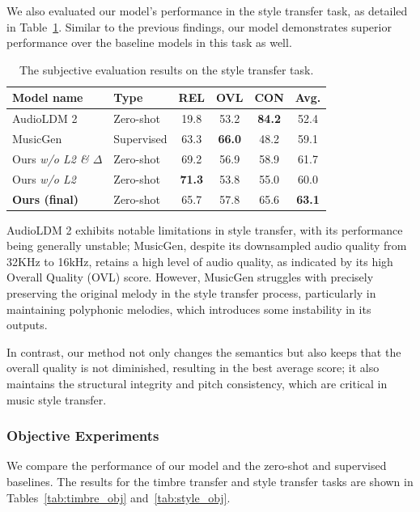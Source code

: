 We also evaluated our model's performance in the style transfer task, as detailed in Table~\ref{tab:style_sub}. Similar to the previous findings, our model demonstrates superior performance over the baseline models in this task as well.

\begin{table}[tb]
\small
    \centering
    \begin{tabular}{l|l|ccc|c}
    \toprule
    \textbf{Model name} & \textbf{Type}    &  \textbf{REL}  & \textbf{OVL} & \textbf{CON} & \textbf{Avg.} \\ 
    \midrule
    AudioLDM 2 &   Zero-shot & 19.8 & 53.2 & \textbf{84.2} & 52.4\\
    MusicGen & Supervised & 63.3 & \textbf{66.0} & 48.2 & 59.1\\
    \midrule
    Ours \textit{w/o L2 \& $\Delta$} & Zero-shot &69.2&56.9&58.9 & 61.7\\
    Ours \textit{w/o L2} & Zero-shot &\textbf{71.3}&53.8&55.0 & 60.0\\
    \midrule
    \textbf{Ours (final)} & Zero-shot & 65.7&57.8&65.6 & \textbf{63.1}\\
    \bottomrule
    \end{tabular}
    \caption{The subjective evaluation results on the style transfer task.}
    \label{tab:style_sub}
\end{table}

AudioLDM 2 exhibits notable limitations in style transfer, with its performance being generally unstable; MusicGen, despite its downsampled audio quality from 32KHz to 16kHz, retains a high level of audio quality, as indicated by its high Overall Quality (OVL) score. However, MusicGen struggles with precisely preserving the original melody in the style transfer process, particularly in maintaining polyphonic melodies, which introduces some instability in its outputs.

In contrast, our method not only changes the semantics but also keeps that the overall quality is not diminished, resulting in the best average score; it also maintains the structural integrity and pitch consistency, which are critical in music style transfer. 

\subsubsection{Objective Experiments}

We compare the performance of our model and the zero-shot and supervised baselines. The results for the timbre transfer and style transfer tasks are shown in Tables~\ref{tab:timbre_obj} and~\ref{tab:style_obj}.

